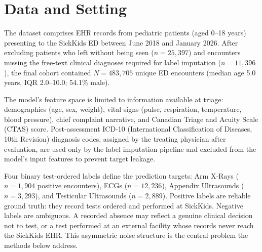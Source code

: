 \section{Data and Setting}

The dataset comprises EHR records from pediatric patients (aged 0--18 years) presenting to the SickKids ED between June 2018 and January 2026. After excluding patients who left without being seen ($n = 25{,}397$) and encounters missing the free-text clinical diagnoses required for label imputation ($n = 11{,}396$), the final cohort contained $N = 483{,}705$ unique ED encounters (median age 5.0 years, IQR 2.0--10.0; 54.1\% male).

The model's feature space is limited to information available at triage: demographics (age, sex, weight), vital signs (pulse, respiration, temperature, blood pressure), chief complaint narrative, and Canadian Triage and Acuity Scale (CTAS) score. Post-assessment ICD-10 (International Classification of Diseases, 10th Revision) diagnosis codes, assigned by the treating physician after evaluation, are used only by the label imputation pipeline and excluded from the model's input features to prevent target leakage.

Four binary test-ordered labels define the prediction targets: Arm X-Rays ($n = 1{,}904$ positive encounters), ECGs ($n = 12{,}236$), Appendix Ultrasounds ($n = 3{,}293$), and Testicular Ultrasounds ($n = 2{,}889$). Positive labels are reliable ground truth: they record tests ordered and performed at SickKids. Negative labels are ambiguous. A recorded absence may reflect a genuine clinical decision not to test, or a test performed at an external facility whose records never reach the SickKids EHR. This asymmetric noise structure is the central problem the methods below address.
